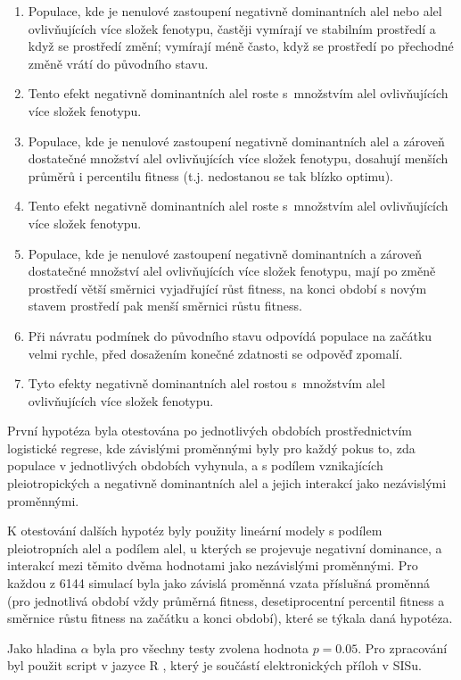 \begin{enumerate}
    \item{Populace, kde je nenulové zastoupení negativně dominantních alel nebo
        alel ovlivňujících více složek fenotypu, častěji vymírají ve stabilním
        prostředí a když se prostředí změní; vymírají méně často, když se prostředí
        po přechodné změně vrátí do původního stavu.}
    \item{Tento efekt negativně dominantních alel roste s množstvím alel ovlivňujících více složek fenotypu.}
    \item{Populace, kde je nenulové zastoupení negativně dominantních alel a zároveň dostatečné množství
          alel ovlivňujících více složek fenotypu, dosahují menších průměrů i percentilu fitness (t.j.
          nedostanou se tak blízko optimu).}
    \item{Tento efekt negativně dominantních alel roste s množstvím alel ovlivňujících více složek fenotypu.}
    \item{Populace, kde je nenulové zastoupení negativně dominantních a zároveň dostatečné množství alel ovlivňujících
                  více složek fenotypu, mají po změně prostředí větší směrnici vyjadřující růst fitness,
                  na konci období s novým stavem prostředí pak menší směrnici růstu fitness.}
    \item{Při návratu podmínek do původního stavu odpovídá populace na začátku velmi rychle, před dosažením konečné
                  zdatnosti se odpověď zpomalí.}
    \item{Tyto efekty negativně dominantních alel rostou s množstvím alel ovlivňujících více složek fenotypu.}
\end{enumerate}

První hypotéza byla  otestována po jednotlivých obdobích prostřednictvím logistické regrese, kde závislými
proměnnými byly pro každý pokus to, zda populace v jednotlivých obdobích vyhynula, a
s podílem vznikajících pleiotropických a negativně dominantních alel a jejich interakcí jako nezávislými proměnnými.

K otestování dalších hypotéz byly použity lineární modely s podílem pleiotropních alel a podílem alel, u kterých se
projevuje negativní dominance, a interakcí mezi těmito dvěma hodnotami jako nezávislými proměnnými. Pro každou z 6144
simulací byla jako závislá proměnná vzata příslušná proměnná (pro jednotlivá období vždy průměrná fitness,
desetiprocentní percentil fitness a směrnice růstu fitness na začátku a konci období), které se týkala daná hypotéza.

Jako hladina $\alpha$ byla pro všechny testy zvolena hodnota $ p = 0.05 $. Pro zpracování byl použit script v jazyce
R \citep{rlanguage}, který je součástí elektronických příloh v SISu.